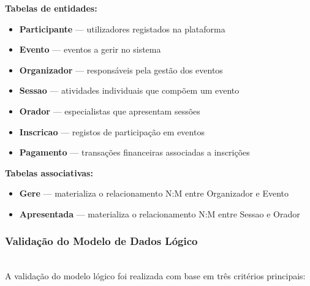 \documentclass[runningheads]{llncs}
\begin{document}
                \noindent\textbf{Tabelas de entidades:}
                \begin{itemize}
                    \item \textbf{Participante} --- utilizadores registados na plataforma
                    \item \textbf{Evento} --- eventos a gerir no sistema
                    \item \textbf{Organizador} --- responsáveis pela gestão dos eventos
                    \item \textbf{Sessao} --- atividades individuais que compõem um evento
                    \item \textbf{Orador} --- especialistas que apresentam sessões
                    \item \textbf{Inscricao} --- registos de participação em eventos
                    \item \textbf{Pagamento} --- transações financeiras associadas a inscrições
                \end{itemize}

                \noindent\textbf{Tabelas associativas:}
                \begin{itemize}
                    \item \textbf{Gere} --- materializa o relacionamento N:M entre Organizador e Evento
                    \item \textbf{Apresentada} --- materializa o relacionamento N:M entre Sessao e Orador
                \end{itemize}

                \subsubsection{Validação do Modelo de Dados Lógico}\mbox{}\\

                A validação do modelo lógico foi realizada com base em três critérios principais:
\end{document}
